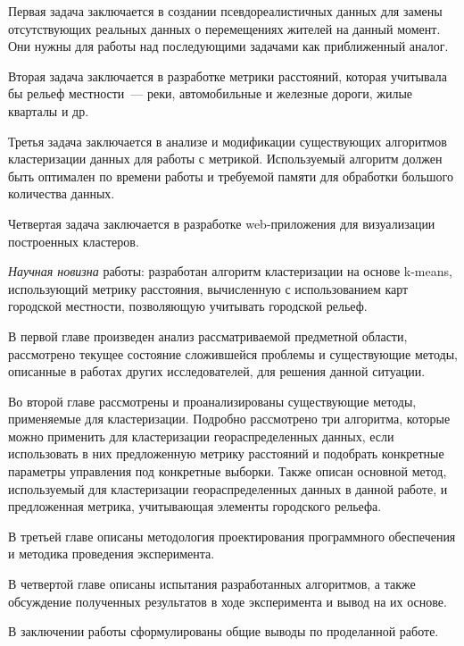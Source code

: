 Первая задача заключается в создании псевдореалистичных данных для замены отсутствующих реальных данных о перемещениях жителей на данный момент. Они нужны для работы над последующими задачами как приближенный аналог.

Вторая задача заключается в разработке метрики расстояний, которая учитывала бы рельеф местности~--- реки, автомобильные и железные дороги, жилые кварталы и др.

Третья задача заключается в анализе и модификации существующих алгоритмов кластеризации данных для работы с метрикой. Используемый алгоритм должен быть оптимален по времени работы и требуемой памяти для обработки большого количества данных.

Четвертая задача заключается в разработке web-приложения для визуализации построенных кластеров.

\emph{Научная новизна} работы: разработан алгоритм кластеризации на основе k-means, использующий метрику расстояния, вычисленную с использованием карт городской местности, позволяющую учитывать городской рельеф.

В первой главе произведен анализ рассматриваемой предметной области, рассмотрено текущее состояние сложившейся проблемы и существующие методы, описанные в работах других исследователей, для решения данной ситуации.

Во второй главе рассмотрены и проанализированы существующие методы, применяемые для кластеризации. Подробно рассмотрено три алгоритма, которые можно применить для кластеризации геораспределенных данных, если использовать в них предложенную метрику расстояний и подобрать конкретные параметры управления под конкретные выборки. Также описан основной метод, используемый для кластеризации геораспределенных данных в данной работе, и предложенная метрика, учитывающая элементы городского рельефа.

В третьей главе описаны методология проектирования программного обеспечения и методика проведения эксперимента.

В четвертой главе описаны испытания разработанных алгоритмов, а также обсуждение полученных результатов в ходе эксперимента и вывод на их основе.

В заключении работы сформулированы общие выводы по проделанной работе.
